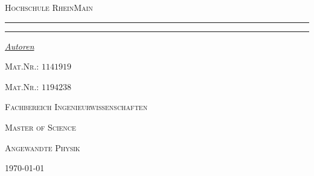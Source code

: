 \begin{titlepage}
	\newcommand{\HRule}{\rule{\linewidth}{0.5mm}}
	\centering
	\textsc{\Large Hochschule RheinMain} \par

	\begin{center}
		
	\end{center}
	\textsc{\LARGE \titleLV}\vspace{0.5cm}
	\HRule\vspace{0.6cm}
	{\huge\bfseries \subtitleA}\par\vspace{0.4cm} %
	{\huge\bfseries \subtitleB}\par\vspace{0.4cm}
	\HRule\vspace{1.5cm}
	\begin{minipage}{0.4\textwidth}
		\centering
		\Large
		\textit{\underline{Autoren}}\par\vspace{0.5cm}
		\textsc{\nameA}\par\vspace{0.25cm}
		\large
		\textsc{Mat.Nr.: \(1141919\)}\par\vspace{.5cm}
		\Large
		\textsc{\nameB}\par\vspace{0.25cm}
		\large
		\textsc{Mat.Nr.: \(1194238\)}\par\vspace{2cm}
	\end{minipage}
	\vfill\vfill\vfill
	\textsc{\Large Fachbereich Ingenieurwissenschaften}\par\vspace{0.5cm}\par
	\textsc{\large Master of Science}\par\vspace{0.5cm}
	\textsc{\large Angewandte Physik}\par\vspace{0.2cm}
	\vfill
	\begin{center}
		{\large\today}
	\end{center}
\end{titlepage}